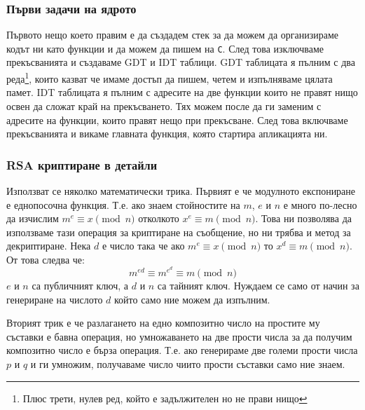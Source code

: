 \subsubsection{Първи задачи на ядрото}
Първото нещо което правим е да създадем стек за да можем да организираме кодът ни като функции и да можем да пишем на {\tt C}. След това изключваме прекъсванията и създаваме GDT и IDT таблици. GDT таблицата я пълним с два реда\footnote{Плюс трети, нулев ред, който е задължителен но не прави нищо}, които казват че имаме достъп да пишем, четем и изпълняваме цялата памет. IDT таблицата я пълним с адресите на две функции които не правят нищо освен да сложат край на прекъсването. Тях можем после да ги заменим с адресите на функции, които правят нещо при прекъсване. След това включваме прекъсванията и викаме главната функция, която стартира апликацията ни.

\subsubsection{RSA криптиране в детайли}
Използват се няколко математически трика. Първият е че модулното експониране е еднопосочна функция. Т.е. ако знаем стойностите на $m$, $e$ и $n$ е много по-лесно да изчислим $m^e \equiv x \pmod n$ отколкото $x^e \equiv m \pmod n$. Това ни позволява да използваме тази операция за криптиране на съобщение, но ни трябва и метод за декриптиране. Нека $d$ е число така че ако $m^e \equiv x \pmod n$ то $x^d \equiv m \pmod n$. От това следва че:
$$m^{ed} \equiv m^{e^d} \equiv m \pmod n$$
$e$ и $n$ са публичният ключ, а $d$ и $n$ са тайният ключ. Нуждаем се само от начин за генериране на числото $d$ който само ние можем да изпълним.

Вторият трик е че разлагането на едно композитно число на простите му съставки е бавна операция, но умножаването на две прости числа за да получим композитно число е бърза операция. Т.е. ако генерираме две големи прости числа $p$ и $q$ и ги умножим, получаваме число чиито прости съставки само ние знаем.

